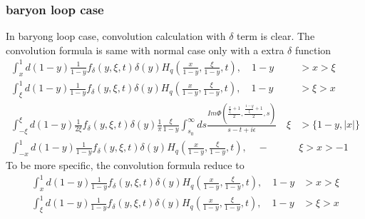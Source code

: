\documentclass[preprintnumbers,prd,superscriptaddress,preprint]{revtex4-1}
\begin{document}
	\subsubsection{baryon loop case}
	In baryong loop case, convolution calculation with $\delta$ term is clear. The convolution formula is same with normal case only with a extra $\delta$ function 
	\begin{align*}
		\int_{x}^{1}d(1-y)\frac{1}{1-y}f_{\delta}(y,\xi,t)\delta(y)H_{q}(\frac{x}{1-y},\frac{\xi}{1-y},t),\quad1-y & >x>\xi\\
		\int_{\xi}^{1}d(1-y)\frac{1}{1-y}f_{\delta}(y,\xi,t)\delta(y)H_{q}(\frac{x}{1-y},\frac{\xi}{1-y},t),\quad1-y & >\xi>x\\
		\int_{-\xi}^{\xi}d(1-y)\frac{1}{2\xi}f_{\delta}(y,\xi,t)\delta(y)\frac{1}{\pi}\frac{\xi}{1-y}\int_{s_{0}}^{\infty}ds\frac{Im\Phi(\frac{\frac{x}{\xi}+1}{2},\frac{\frac{1-y}{\xi}+1}{2},s)}{s-t+i\epsilon}\quad\xi & >\{1-y,|x|\}\\
		\int_{-x}^{1}d(1-y)\frac{1}{1-y}f_{\delta}(y,\xi,t)\delta(y)H_{q}(\frac{x}{1-y},\frac{\xi}{1-y},t),\quad- & \xi>x>-1
	\end{align*}
	To be more specific, the convolution formula reduce to 
	\begin{align*}
		\int_{x}^{1}d(1-y)\frac{1}{1-y}f_{\delta}(y,\xi,t)\delta(y)H_{q}(\frac{x}{1-y},\frac{\xi}{1-y},t),\quad1-y & >x>\xi\\
		\int_{\xi}^{1}d(1-y)\frac{1}{1-y}f_{\delta}(y,\xi,t)\delta(y)H_{q}(\frac{x}{1-y},\frac{\xi}{1-y},t),\quad1-y & >\xi>x
	\end{align*}
\end{document}
